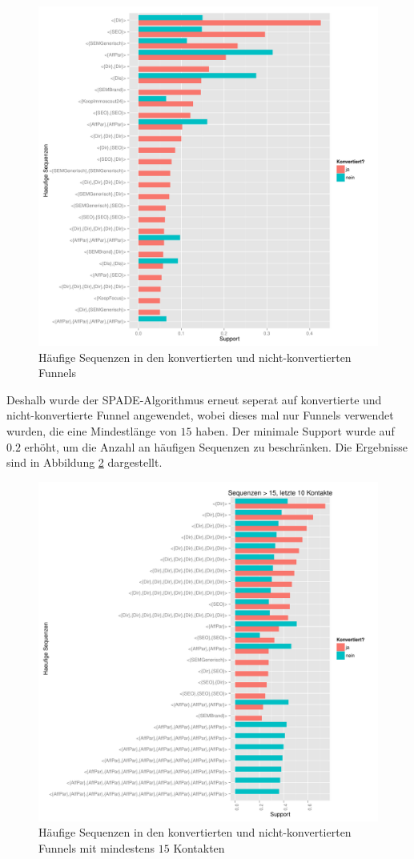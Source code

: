 \begin{figure}[H]
	\centering\includegraphics[scale=0.6]{spm_all.pdf}\caption{Häufige Sequenzen in den konvertierten und nicht-konvertierten Funnels}\label{spm_all}
\end{figure}
Deshalb wurde der SPADE-Algorithmus erneut seperat auf konvertierte und nicht-konvertierte Funnel angewendet, wobei dieses mal nur Funnels verwendet wurden, die eine Mindestlänge von $15$ haben. Der minimale Support wurde auf $0.2$ erhöht, um die Anzahl an häufigen Sequenzen zu beschränken. Die Ergebnisse sind in Abbildung \ref{spm_min15} dargestellt.\\
\begin{figure}[H]
	\centering\includegraphics[scale=0.6]{spm_min15.pdf}\caption{Häufige Sequenzen in den konvertierten und nicht-konvertierten Funnels mit mindestens $15$ Kontakten}\label{spm_min15}
\end{figure}
